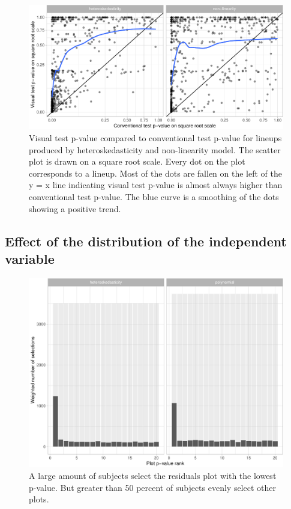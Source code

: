 \documentclass[]{interact}
\theoremstyle{plain}%
\theoremstyle{definition}
\theoremstyle{remark}
\begin{document}
\begin{figure}

{\centering \includegraphics[width=1\linewidth]{paper_comparison_files/figure-latex/p-value-comparison-1} 

}

\caption{Visual test p-value compared to conventional test p-value for lineups produced by heteroskedasticity and non-linearity model. The scatter plot is drawn on a square root scale. Every dot on the plot corresponds to a lineup. Most of the dots are fallen on the left of the y = x line indicating visual test p-value is almost always higher than conventional test p-value. The blue curve is a smoothing of the dots showing a positive trend. }\label{fig:p-value-comparison}
\end{figure}

\hypertarget{effect-of-the-distribution-of-the-independent-variable}{%
\subsection{Effect of the distribution of the independent
variable}\label{effect-of-the-distribution-of-the-independent-variable}}

\begin{figure}

{\centering \includegraphics[width=1\linewidth]{paper_comparison_files/figure-latex/plotsel-1} 

}

\caption{A large amount of subjects select the residuals plot with the lowest p-value. But greater than 50 percent of subjects evenly select other plots.}\label{fig:plotsel}
\end{figure}
\end{document}
